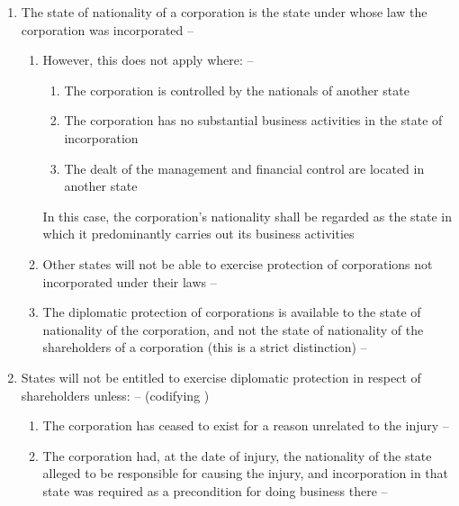 \begin{enumerate}
    \begin{enumerate}
        \item The state of nationality of a corporation is the state under whose law the corporation was incorporated -- 
        \begin{enumerate}
            \item However, this does not apply where: -- 
            \begin{enumerate}
                \item The corporation is controlled by the nationals of another state
                \item The corporation has no substantial business activities in the state of incorporation
                \item The dealt of the management and financial control are located in another state
            \end{enumerate}
            In this case, the corporation's nationality shall be regarded as the state in which it predominantly carries out its business activities
            \item Other states will not be able to exercise protection of corporations not incorporated under their laws -- 
            \item The diplomatic protection of corporations is available to the state of nationality of the corporation, and not the state of nationality of the shareholders of a corporation (this is a strict distinction) -- 
        \end{enumerate}
        \item States will not be entitled to exercise diplomatic protection in respect of shareholders unless: --  (codifying )
        \begin{enumerate}
            \item The corporation has ceased to exist for a reason unrelated to the injury -- 
            \item The corporation had, at the date of injury, the nationality of the state alleged to be responsible for causing the injury, and incorporation in that state was required as a precondition for doing business there -- 

\end{enumerate}
\end{enumerate}
\end{enumerate}
